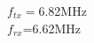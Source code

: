 \documentclass[preview]{standalone}
\begin{document}
\begin{center}
$f_{tx}=$6.82MHz\\$f_{rx}$=6.62MHz
\end{center}
\end{document}
